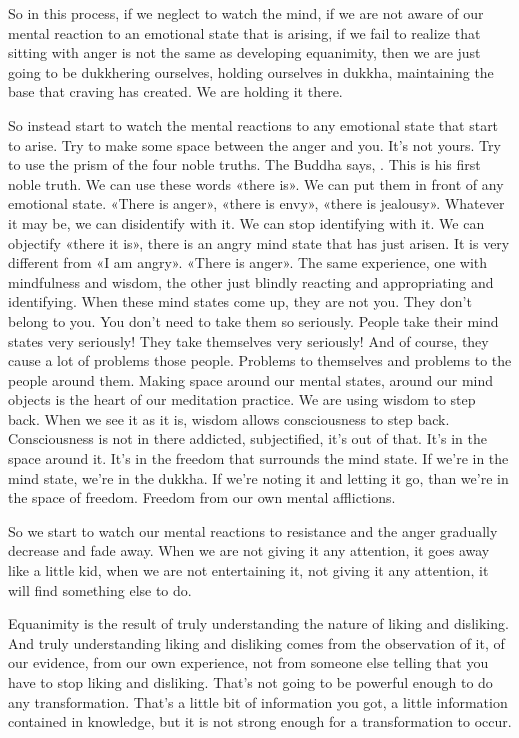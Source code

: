 \documentclass[letterpaper,10pt,english]{sphinxmanual}
\begin{document}
\sphinxAtStartPar
So in this process, if we neglect to watch the mind, if we are not aware
of our mental reaction to an emotional state that is arising, if we fail to realize  that  sitting  with  anger  is  not  the  same  as  developing  equanimity,  then
we are just going to be dukkhering ourselves, holding ourselves in dukkha,
maintaining the base that craving has created. We are holding it there.

\sphinxAtStartPar
So instead start to watch the mental reactions to any emotional state
that start to arise. Try to make some space between the anger and you. It’s
not yours. Try to use the prism of the four noble truths. The Buddha says,
. This is his first noble truth. We can use these words «there
is». We can put them in front of any emotional state. «There is anger», «there
is envy», «there is jealousy». Whatever it may be, we can dis\sphinxhyphen{}identify with
it. We can stop identifying with it. We can objectify «there it is», there is an
angry mind state that has just arisen. It is very different from «I am angry».
«There is anger». The same experience, one with mindfulness and wisdom,
the other just blindly reacting and appropriating and identifying. When these
mind states come up, they are not you. They don’t belong to you. You don’t
need to take them so seriously. People take their mind states very seriously!
They  take  themselves  very  seriously!  And  of  course,  they  cause  a  lot  of
problems those people. Problems to themselves and problems to the people
around  them.  Making  space  around  our  mental  states,  around  our  mind
objects is the heart of our meditation practice. We are using wisdom to step
back. When  we  see  it  as  it  is,  wisdom  allows  consciousness  to  step  back.
Consciousness is not in there addicted, subjectified, it’s out of that. It’s in the
  space around it. It’s in the freedom that surrounds the mind state. If we’re in
the mind state, we’re in the dukkha. If we’re noting it and letting it go, than
we’re in the space of freedom. Freedom from our own mental afflictions.

\sphinxAtStartPar
So we start to watch our mental reactions to resistance and the anger
gradually decrease and fade away. When we are not giving it any attention, it
goes away like a little kid, when we are not entertaining it, not giving it any
attention, it will find something else to do.

\sphinxAtStartPar
Equanimity  is  the  result  of  truly  understanding  the  nature  of  liking
and disliking. And truly understanding liking and disliking comes from the
observation of it, of our evidence, from our own experience, not from someone else telling that you have to stop liking and disliking. That’s not going to
be powerful enough to do any transformation. That’s a little bit of information you got, a little information contained in knowledge, but it is not strong
enough for a transformation to occur.
\end{document}
